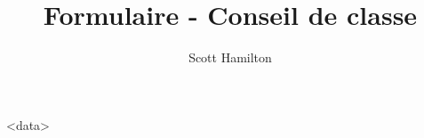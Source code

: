\documentclass[a4paper]{article}
\title{Formulaire - Conseil de classe}
\author{Scott Hamilton}
\date{}
\begin{document}
\maketitle

<data>
\end{document}
